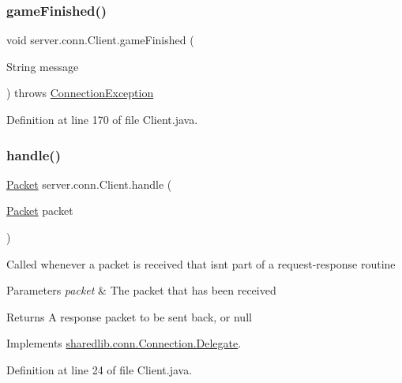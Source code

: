 \subsubsection{\texorpdfstring{game\+Finished()}{gameFinished()}}
{\footnotesize\ttfamily void server.\+conn.\+Client.\+game\+Finished (\begin{DoxyParamCaption}\item[{String}]{message }\end{DoxyParamCaption}) throws \hyperlink{classsharedlib_1_1exceptions_1_1_connection_exception}{Connection\+Exception}}



Definition at line 170 of file Client.\+java.

\hypertarget{classserver_1_1conn_1_1_client_a0ddbd06c67e01c0064b5640d5e82c810}{}\label{classserver_1_1conn_1_1_client_a0ddbd06c67e01c0064b5640d5e82c810} 
\subsubsection{\texorpdfstring{handle()}{handle()}}
{\footnotesize\ttfamily \hyperlink{classsharedlib_1_1conn_1_1_packet}{Packet} server.\+conn.\+Client.\+handle (\begin{DoxyParamCaption}\item[{\hyperlink{classsharedlib_1_1conn_1_1_packet}{Packet}}]{packet }\end{DoxyParamCaption})}

Called whenever a packet is received that isn\textquotesingle{}t part of a request-\/response routine


\begin{DoxyParams}{Parameters}
{\em packet} & The packet that has been received \\
\hline
\end{DoxyParams}
\begin{DoxyReturn}{Returns}
A response packet to be sent back, or null 
\end{DoxyReturn}


Implements \hyperlink{interfacesharedlib_1_1conn_1_1_connection_1_1_delegate_abb4308f0b1aa890e0c19635f1eb9cd09}{sharedlib.\+conn.\+Connection.\+Delegate}.



Definition at line 24 of file Client.\+java.

\hypertarget{classserver_1_1conn_1_1_client_a7335f0aef6a3b7af5a9194a2bfa69632}{}\label{classserver_1_1conn_1_1_client_a7335f0aef6a3b7af5a9194a2bfa69632} 
